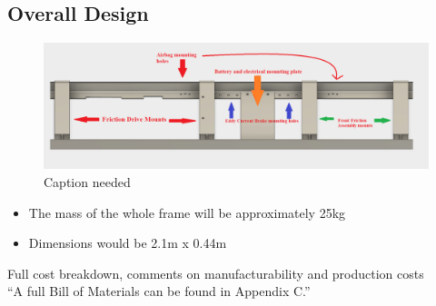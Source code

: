 \documentclass{report}
\begin{document}
    \subsection{Overall Design}
    \begin{figure}[H]
        \centering
        \includegraphics[width=\linewidth]{images/fig24}
        \caption{Caption needed}
    \end{figure}
    \begin{itemize}
        \item The mass of the whole frame will be approximately 25kg
        \item Dimensions would be 2.1m x 0.44m
    \end{itemize}
    Full cost breakdown, comments on manufacturability and production costs\\
    “A full Bill of Materials can be found in Appendix C.”
    
\end{document}
